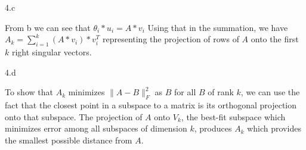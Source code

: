 \LARGE
4.c
\normalsize

\begin{answer}
From b we can see that $\theta_i * u_i = A * v_i$
Using that in the summation, we have $A_k = \sum_{i=1}^{k} (A*v_i)*v^T_i$
representing the projection of rows of $A$ onto the first $k$ right singular vectors.
\end{answer}
\clearpage

\LARGE
4.d
\normalsize

\begin{answer}
To show that $A_k$ minimizes $\|A - B\|_F^2$ as $B$ for all $B$ of rank $k$, we can use the fact 
that the closest point in a subspace to a matrix is its orthogonal projection onto that subspace.
The projection of $A$ onto $V_k$, the best-fit subspace which minimizes error among all subspaces of dimension $k$, 
produces $A_k$ which provides the smallest possible distance from $A$.
\end{answer}
\clearpage


